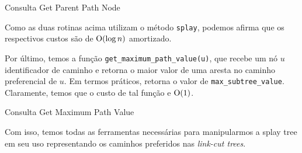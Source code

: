 \begin{algorithm}[h!]
    \caption{Consulta Get Parent Path Node}\label{splay:get-parent-path}
    \begin{algorithmic}[1]
        \State {}
        \EndFunction
    \end{algorithmic}
\end{algorithm}

Como as duas rotinas acima utilizam o método \texttt{splay}, podemos afirma que os respectivos custos são de $\mathrm{O}(\log n)$ amortizado.

Por último, temos a função \texttt{get\_maximum\_path\_value(u)}, que recebe um nó $u$ identificador de caminho e retorna o maior valor de uma aresta no caminho preferencial de $u$. Em termos práticos, retorna o valor de \texttt{max\_subtree\_value}. Claramente, temos que o custo de tal função e $\mathrm{O}(1)$.

\begin{algorithm}[h!]
    \caption{Consulta Get Maximum Path Value}\label{splay:get-maximum-value}
    \begin{algorithmic}[1]
        \State {}
        \EndFunction
    \end{algorithmic}
\end{algorithm}

Com isso, temos todas as ferramentas necessárias para manipularmos a splay tree em seu uso representando os caminhos preferidos nas \emph{link-cut trees}.